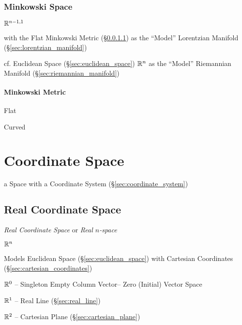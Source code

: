 \subsubsection{Minkowski Space}\label{sec:minkowski_space}

$\mathbb{R}^{n-1,1}$

with the Flat Minkowski Metric (\S\ref{sec:minkowski_metric}) as the
``Model'' Lorentzian Manifold (\S\ref{sec:lorentzian_manifold})

cf. Euclidean Space (\S\ref{sec:euclidean_space}) $\mathbb{R}^n$ as the
``Model'' Riemannian Manifold (\S\ref{sec:riemannian_manifold})



\paragraph{Minkowski Metric}\label{sec:minkowski_metric}\hfill

Flat

Curved



\section{Coordinate Space}\label{sec:coordinate_space}

a Space with a Coordinate System (\S\ref{sec:coordinate_system})



\subsection{Real Coordinate Space}\label{sec:real_coordinate_space}

\emph{Real Coordinate Space} or \emph{Real $n$-space}

$\mathbb{R}^n$

Models Euclidean Space (\S\ref{sec:euclidean_space}) with Cartesian
Coordinates (\S\ref{sec:cartesian_coordinates})

$\mathbb{R}^0$ -- Singleton Empty Column Vector-- Zero (Initial) Vector
Space

$\mathbb{R}^1$ -- Real Line (\S\ref{sec:real_line})

$\mathbb{R}^2$ -- Cartesian Plane (\S\ref{sec:cartesian_plane})

